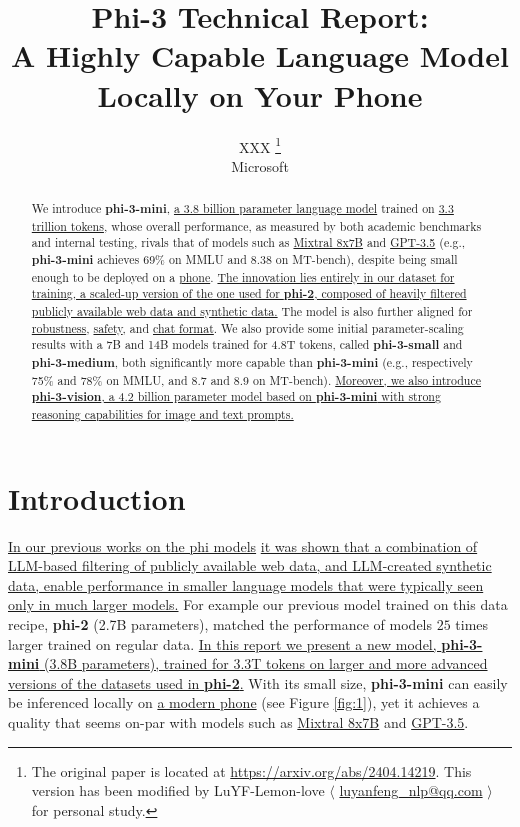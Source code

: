\documentclass[11pt]{article}
\begin{document}
\title{Phi-3 Technical Report: \\
A Highly Capable Language Model Locally on Your Phone}

\author{
    XXX \thanks{The original paper is located at \url{https://arxiv.org/abs/2404.14219}. This version has been modified by LuYF-Lemon-love $\langle$ \url{luyanfeng_nlp@qq.com} $\rangle$ for personal study.}\\
    Microsoft
}
\date{}

\maketitle

\begin{abstract}
We introduce \textbf{phi-3-mini}, \uline{a 3.8 billion parameter language model} trained on \uline{3.3 trillion tokens}, whose overall performance, as measured by both academic benchmarks and internal testing, rivals that of models such as \uline{Mixtral 8x7B} and \uline{GPT-3.5} (e.g., \textbf{phi-3-mini} achieves 69\% on MMLU and 8.38 on MT-bench), despite being small enough to be deployed on a \uline{phone}. \uline{The innovation lies entirely in our dataset for training, a scaled-up version of the one used for \textbf{phi-2}, composed of heavily filtered publicly available web data and synthetic data.} The model is also further aligned for \uline{robustness}, \uline{safety}, and \uline{chat format}.
We also provide some initial parameter-scaling results with a 7B and 14B models trained for 4.8T tokens, called \textbf{phi-3-small} and \textbf{phi-3-medium}, both significantly more capable than \textbf{phi-3-mini} (e.g., respectively 75\% and 78\% on MMLU, and 8.7 and 8.9 on MT-bench). \uline{Moreover, we also introduce \textbf{phi-3-vision}, a 4.2 billion parameter model based on \textbf{phi-3-mini} with strong reasoning capabilities for image and text prompts.}
\end{abstract}

\section{Introduction}
\uline{In our previous works on the phi models} \cite{gunasekar2023textbooks,li2023textbooks, javaheripi2023phi} \uline{it was shown that a combination of LLM-based filtering of publicly available web data, and LLM-created synthetic data, enable performance in smaller language models that were typically seen only in much larger models.} For example our previous model trained on this data recipe, \textbf{phi-2} (2.7B parameters), matched the performance of models $25$ times larger trained on regular data. \uline{In this report we present a new model, \textbf{phi-3-mini} (3.8B parameters), trained for 3.3T tokens on larger and more advanced versions of the datasets used in \textbf{phi-2}.} With its small size, \textbf{phi-3-mini} can easily be inferenced locally on \uline{a modern phone} (see Figure \ref{fig:1}), yet it achieves a quality that seems on-par with models such as \uline{Mixtral 8x7B} \cite{jiang2024mixtral} and \uline{GPT-3.5}.
\end{document}
